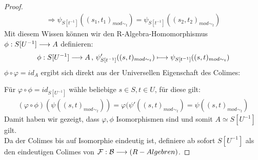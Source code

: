 \documentclass[10pt,a4paper]{report}
\newcommand{\functionfront}[3]{\nolinebreak{#1:#2 \longrightarrow #3}}
\newcommand{\function}[5]{\nolinebreak{#1:#2 \longrightarrow #3 \, , \, #4 \longmapsto #5}}
\newcommand{\lok}[2]{#1 [#2^{-1}]}
\newcommand{\loke}[3]{(#1,#2)_{mod\sim_{#3}}}
\begin{document}
\begin{proof}
\begin{align*}
\Rightarrow  \psi_{\lok{S}{t}}(\loke{s_1}{t_1}{t}) = \psi_{\lok{S}{t}}(\loke{s_2}{t_2}{t})
\end{align*}
Mit diesem Wissen können wir den R-Algebra-Homomorphismus $\functionfront{\phi}{\lok{S}{U}}{A}$ definieren:
\begin{gather*}
\function{\phi}{\lok{S}{U}}{A}{\psi'_{\lok{S}{t}}(\loke{s}{t}{t})}{\psi_{\lok{S}{t}}(\loke{s}{t}{t})}
\end{gather*}
$\phi \circ \varphi = id_A$ ergibt sich direkt aus der Universellen Eigenschaft des Colimes:
\begin{center}
\end{center}
Für $\varphi \circ \phi = id_{\lok{S}{U}}$ wähle beliebige $s \in S , t \in U$, für diese gilt:
\begin{gather*}
(\varphi \circ \phi)(\psi(\loke{s}{t}{t})) =
 \varphi (\psi'(\loke{s}{t}{t}) =
  \psi(\loke{s}{t}{t})
\end{gather*}
Damit haben wir gezeigt, dass $\varphi,\phi$ Isomorphismen sind und somit $A \simeq \lok{S}{U}$ gilt.\\
Da der Colimes bis auf Isomorphie eindeutig ist, definiere ab sofort $\lok{S}{U}$ als den eindeutigen Colimes von
 $\functionfront{\mathcal{F}}{\mathcal{B}}{(R-Algebren)}$.
\end{proof}
\end{document}
